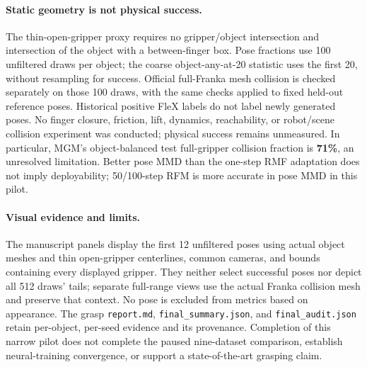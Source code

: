 \paragraph{Static geometry is not physical success.}
The thin-open-gripper proxy requires no gripper/object intersection and
intersection of the object with a between-finger box. Pose fractions use 100
unfiltered draws per object; the coarse object-any-at-20 statistic uses the
first 20, without resampling for success. Official full-Franka mesh collision
is checked separately on those 100 draws, with the same checks applied to
fixed held-out reference poses. Historical positive FleX labels do not label
newly generated poses. No finger closure, friction, lift, dynamics,
reachability, or robot/scene collision experiment was conducted; physical
success remains unmeasured. In particular, MGM's object-balanced test
full-gripper collision fraction is \textbf{71\%}, an unresolved limitation.
Better pose MMD than the one-step RMF adaptation does not imply deployability;
50/100-step RFM is more accurate in pose MMD in this pilot.

\paragraph{Visual evidence and limits.}
The manuscript panels display the first 12 unfiltered poses using actual object
meshes and thin open-gripper centerlines, common cameras, and bounds containing
every displayed gripper. They neither select successful poses nor depict all
512 draws' tails; separate full-range views use the actual Franka collision
mesh and preserve that context. No pose is excluded from
metrics based on appearance. The grasp \texttt{report.md},
\texttt{final\_summary.json}, and \texttt{final\_audit.json} retain per-object,
per-seed evidence and its provenance. Completion of this narrow pilot does
not complete the paused nine-dataset comparison, establish neural-training
convergence, or support a state-of-the-art grasping claim.
